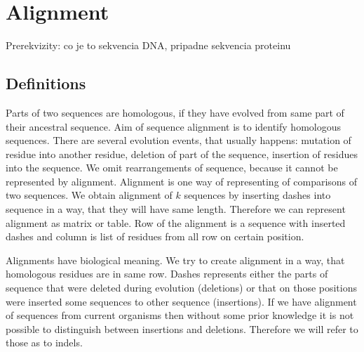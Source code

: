 \chapter{Alignment}
\begin{note}
Prerekvizity: co je to sekvencia DNA, pripadne sekvencia proteinu
\end{note}
\section{Definitions}

Parts of two sequences are homologous, if they have evolved from same part of
their ancestral sequence. Aim of sequence alignment is to identify homologous
sequences. There are several evolution events, that usually happens:
mutation of residue into another residue, deletion of part of the sequence,
insertion of residues into the sequence. We omit rearrangements of sequence,
because it cannot be represented by alignment. Alignment is one way of
representing of comparisons of two sequences. We obtain alignment of $k$
sequences by inserting dashes into sequence in a way, that they will have same
length. Therefore we can represent alignment as matrix or table. Row of the
alignment is a sequence with inserted dashes and column is list of residues from
all row on certain position.

Alignments have biological meaning. We try to create alignment in a way, that
homologous residues are in same row. Dashes represents either the parts of
sequence that were deleted during evolution (deletions) or that on those
positions were inserted some sequences to other sequence (insertions). If we
have alignment of sequences from current organisms then without some prior
knowledge it is not possible to distinguish between insertions and deletions.
Therefore we will refer to those as to indels.


